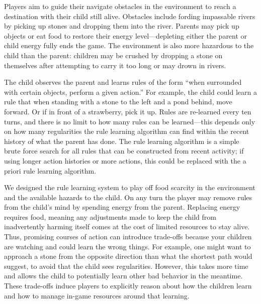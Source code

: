 \documentclass{sig-alternate}
\begin{document}
Players aim to guide their navigate obstacles in the environment to reach a destination with their child still alive.
Obstacles include fording impassable rivers by picking up stones and dropping them into the river.
Parents may pick up objects or eat food to restore their energy level---depleting either the parent or child energy fully ends the game.
The environment is also more hazardous to the child than the parent: children may be crushed by dropping a stone on themselves after attempting to carry it too long or may drown in rivers.

The child observes the parent and learns rules of the form ``when surrounded with certain objects, perform a given action.''
For example, the child could learn a rule that when standing with a stone to the left and a pond behind, move forward.
Or if in front of a strawberry, pick it up.
Rules are re-learned every ten turns, and there is no limit to how many rules can be learned---this depends only on how many regularities the rule learning algorithm can find within the recent history of what the parent has
done.
The rule learning algorithm is a simple brute force search for all rules that can be constructed from recent activity; if using longer action histories or more actions, this could be replaced with the a priori rule learning algorithm.

We designed the rule learning system to play off food scarcity in the environment and the available hazards to the child.
On any turn the player may remove rules from the child's mind by spending energy from the parent.
Replacing energy requires food, meaning any adjustments made to keep the child from inadvertently harming itself comes at the cost of limited resources to stay alive.
Thus, promising courses of action can introduce trade-offs because your children are watching and could learn the wrong things.
For example, one might want to approach a stone from the opposite direction than what the shortest path would suggest, to avoid that the child sees regularities.
However, this takes more time and allows the child to potentially learn other bad behavior in the meantime.
These trade-offs induce players to explicitly reason about how the children learn and how to manage in-game resources around that learning.
\end{document}

